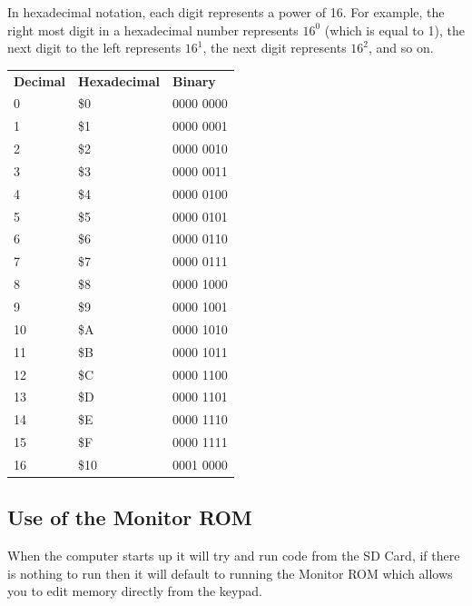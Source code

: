 \documentclass{ol-softwaremanual}
\begin{document}
In hexadecimal notation, each digit represents a power of 16. For example, the right most digit in a hexadecimal number represents $16^0$ (which is equal to 1), the next digit to the left represents $16^1$, the next digit represents $16^2$, and so on.\\
\begin{table}[h]
\centering
\begin{tabular}{|l|l|l|}
\cline{1-3}
\textbf{Decimal} & \textbf{Hexadecimal} & \textbf{Binary}\\ \cline{1-3}
0   & \$0   & 0000 0000\\ \cline{1-3}
1   & \$1   & 0000 0001\\ \cline{1-3}
2   & \$2   & 0000 0010\\ \cline{1-3}
3   & \$3   & 0000 0011\\ \cline{1-3}
4   & \$4   & 0000 0100\\ \cline{1-3}
5   & \$5   & 0000 0101\\ \cline{1-3}
6   & \$6   & 0000 0110\\ \cline{1-3}
7   & \$7   & 0000 0111\\ \cline{1-3}
8   & \$8   & 0000 1000\\ \cline{1-3}
9   & \$9   & 0000 1001\\ \cline{1-3}
10  & \$A   & 0000 1010\\ \cline{1-3}
11  & \$B   & 0000 1011\\ \cline{1-3}
12  & \$C   & 0000 1100\\ \cline{1-3}
13  & \$D   & 0000 1101\\ \cline{1-3}
14  & \$E   & 0000 1110\\ \cline{1-3}
15  & \$F   & 0000 1111\\ \cline{1-3}
16  & \$10  & 0001 0000\\ \cline{1-3}
\end{tabular}
\end{table}
\pagebreak


\subsection{Use of the Monitor ROM}
When the computer starts up it will try and run code from the SD Card, if there is nothing to run then it will default to running the Monitor ROM which allows you to edit memory directly from the keypad.\\
\end{document}
